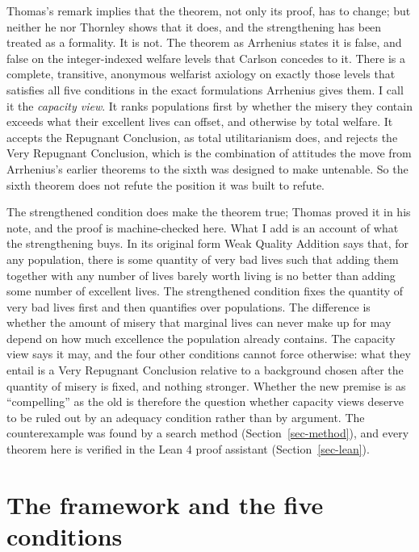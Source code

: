 \documentclass[
  11pt,
  letterpaper,
  DIV=11,
  numbers=noendperiod,
  twoside]{scrartcl}
\begin{document}
Thomas's remark implies that the theorem, not only its proof, has to
change; but neither he nor Thornley shows that it does, and the
strengthening has been treated as a formality. It is not. The theorem as
Arrhenius states it is false, and false on the integer-indexed welfare
levels that Carlson concedes to it. There is a complete, transitive,
anonymous welfarist axiology on exactly those levels that satisfies all
five conditions in the exact formulations Arrhenius gives them. I call
it the \emph{capacity view}. It ranks populations first by whether the
misery they contain exceeds what their excellent lives can offset, and
otherwise by total welfare. It accepts the Repugnant Conclusion, as
total utilitarianism does, and rejects the Very Repugnant Conclusion,
which is the combination of attitudes the move from Arrhenius's earlier
theorems to the sixth was designed to make untenable. So the sixth
theorem does not refute the position it was built to refute.

The strengthened condition does make the theorem true; Thomas proved it
in his note, and the proof is machine-checked here. What I add is an
account of what the strengthening buys. In its original form Weak
Quality Addition says that, for any population, there is some quantity
of very bad lives such that adding them together with any number of
lives barely worth living is no better than adding some number of
excellent lives. The strengthened condition fixes the quantity of very
bad lives first and then quantifies over populations. The difference is
whether the amount of misery that marginal lives can never make up for
may depend on how much excellence the population already contains. The
capacity view says it may, and the four other conditions cannot force
otherwise: what they entail is a Very Repugnant Conclusion relative to a
background chosen after the quantity of misery is fixed, and nothing
stronger. Whether the new premise is as ``compelling'' as the old is
therefore the question whether capacity views deserve to be ruled out by
an adequacy condition rather than by argument. The counterexample was
found by a search method (Section~\ref{sec-method}), and every theorem
here is verified in the Lean 4 proof assistant (Section~\ref{sec-lean}).

\section{The framework and the five conditions}\label{sec-conditions}
\end{document}
